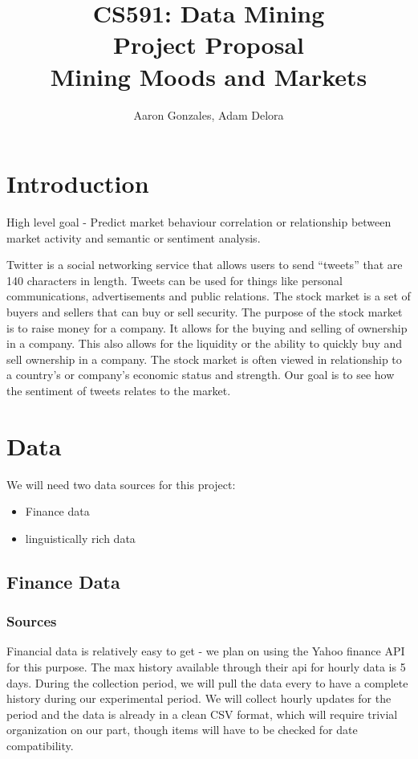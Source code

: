 \documentclass[titlepage]{article}\usepackage[]{graphicx}\usepackage[]{color}
\begin{document}
\title{CS591: Data Mining \\ Project Proposal \\ Mining Moods and Markets}
\author{Aaron Gonzales, Adam Delora}
\maketitle



\section{Introduction}


High level goal - Predict market behaviour correlation or relationship between market activity and semantic or sentiment analysis.

Twitter is a social networking service that allows users to send “tweets” that are 140 characters in length. Tweets can be used for things like personal communications, advertisements and public relations.  The stock market is a set of buyers and sellers that can buy or sell security. The purpose of the stock market is to raise money for a company. It allows for the buying and selling of ownership in a company. This also allows for the liquidity or the ability to quickly buy and sell ownership in a company. The stock market is often viewed in relationship to a country’s or company’s economic status and strength. Our goal is to see how the sentiment of tweets relates to the market.


\section{Data}

We will need two data sources for this project: 
\begin{itemize}
	\item Finance data
	\item linguistically rich data
\end{itemize}

\subsection{Finance Data}
\subsubsection{Sources}
Financial data is relatively easy to get - we plan on using the Yahoo finance
API for this purpose. The max history available through their api for hourly data is 5 days.
During the collection period, we will pull the data every to have
a complete history during our experimental period. We will collect hourly
updates for the period and the data is already in a clean CSV format, which
will require trivial organization on our part, though items will have to be
checked for date compatibility. 
\end{document}

